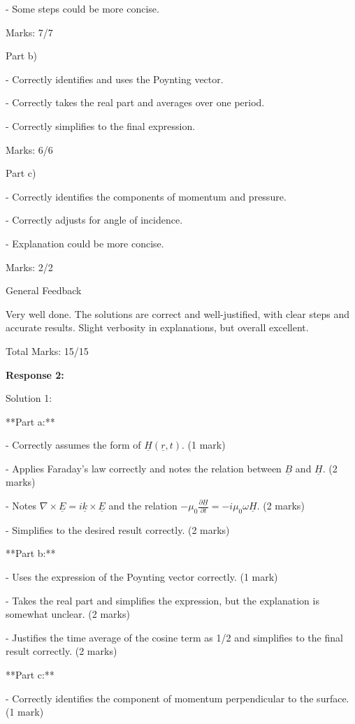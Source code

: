 \documentclass[a4paper,11pt]{article}
\begin{document}
- Some steps could be more concise.

Marks: 7/7

Part b)

- Correctly identifies and uses the Poynting vector.

- Correctly takes the real part and averages over one period.

- Correctly simplifies to the final expression.

Marks: 6/6

Part c)

- Correctly identifies the components of momentum and pressure.

- Correctly adjusts for angle of incidence.

- Explanation could be more concise.

Marks: 2/2

General Feedback

Very well done. The solutions are correct and well-justified, with clear steps and accurate results. Slight verbosity in explanations, but overall excellent.

Total Marks: 15/15

\bigskip
\textbf{Response 2:}

Solution 1:

**Part a:**

- Correctly assumes the form of \( \underline{H}(\underline{r}, t) \). (1 mark)

- Applies Faraday’s law correctly and notes the relation between \(\underline{B}\) and \(\underline{H}\). (2 marks)

- Notes \( \nabla \times \underline{E} = i \underline{k} \times \underline{E} \) and the relation \( - \mu_0 \frac{\partial \underline{H}}{\partial t} = - i \mu_0 \omega \underline{H} \). (2 marks)

- Simplifies to the desired result correctly. (2 marks)

**Part b:**

- Uses the expression of the Poynting vector correctly. (1 mark)

- Takes the real part and simplifies the expression, but the explanation is somewhat unclear. (2 marks)

- Justifies the time average of the cosine term as 1/2 and simplifies to the final result correctly. (2 marks)

**Part c:**

- Correctly identifies the component of momentum perpendicular to the surface. (1 mark)
\end{document}
